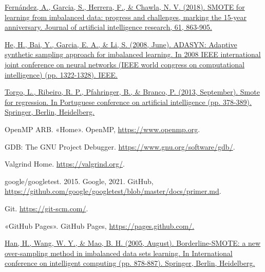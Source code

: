 \begin{thebibliography}{9}


	\href{https://www.jair.org/index.php/jair/article/view/11192}{Fernández, A., Garcia, S., Herrera, F., \& Chawla, N. V. (2018). SMOTE for learning from imbalanced data: progress and challenges, marking the 15-year anniversary. Journal of artificial intelligence research, 61, 863-905.}


	\href{https://ieeexplore.ieee.org/abstract/document/4633969}{He, H., Bai, Y., Garcia, E. A., \& Li, S. (2008, June). ADASYN: Adaptive synthetic sampling approach for imbalanced learning. In 2008 IEEE international joint conference on neural networks (IEEE world congress on computational intelligence) (pp. 1322-1328). IEEE.}



	\href{https://link.springer.com/chapter/10.1007/978-3-642-40669-0_33}{Torgo, L., Ribeiro, R. P., Pfahringer, B., \& Branco, P. (2013, September). Smote for regression. In Portuguese conference on artificial intelligence (pp. 378-389). Springer, Berlin, Heidelberg. }





	OpenMP ARB. «Home». OpenMP, \url{https://www.openmp.org}.


	GDB: The GNU Project Debugger. \url{https://www.gnu.org/software/gdb/}.


	Valgrind Home. \url{https://valgrind.org/}.


	google/googletest. 2015. Google, 2021. GitHub, \url{https://github.com/google/googletest/blob/master/docs/primer.md}.


	Git. \url{https://git-scm.com/}.


	«GitHub Pages». GitHub Pages, \url{https://pages.github.com/.}


	\href{https://link.springer.com/chapter/10.1007/11538059_91}{Han, H., Wang, W. Y., \& Mao, B. H. (2005, August). Borderline-SMOTE: a new over-sampling method in imbalanced data sets learning. In International conference on intelligent computing (pp. 878-887). Springer, Berlin, Heidelberg.}


\end{thebibliography}
